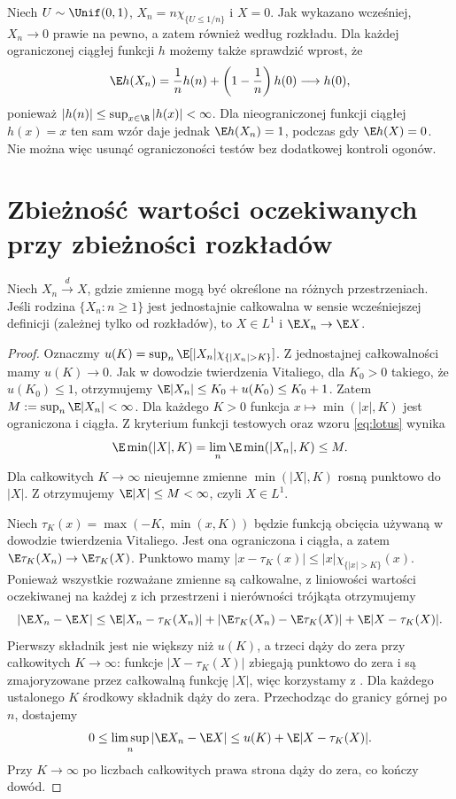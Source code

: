 \begin{przyklad}
Niech $U\sim\Unif(0,1)$, $X_n=n\chi_{\{U\leq1/n\}}$
i $X=0$. Jak wykazano wcześniej, $X_n\to0$ prawie
na pewno, a zatem również według rozkładu.
Dla każdej ograniczonej ciągłej funkcji $h$ możemy
także sprawdzić wprost, że
\[
\E h(X_n)=\frac1n h(n)+\left(1-\frac1n\right)h(0)
\longrightarrow h(0),
\]
ponieważ $|h(n)|\leq\sup_{x\in\R}|h(x)|<\infty$.
Dla nieograniczonej funkcji ciągłej $h(x)=x$
ten sam wzór daje jednak $\E h(X_n)=1$,
podczas gdy $\E h(X)=0$.
Nie można więc usunąć ograniczoności testów
bez dodatkowej kontroli ogonów.
\end{przyklad}

\section{Zbieżność wartości oczekiwanych przy zbieżności rozkładów}

\begin{twierdzenie}
Niech $X_n\xrightarrow{d}X$, gdzie zmienne mogą być
określone na różnych przestrzeniach. Jeśli rodzina
$\{X_n:n\geq1\}$ jest jednostajnie całkowalna
w sensie wcześniejszej definicji (zależnej tylko od rozkładów),
to $X\in L^1$ i $\E X_n\to\E X$.
\end{twierdzenie}
\begin{proof}
Oznaczmy $u(K)=\sup_n\E[|X_n|\chi_{\{|X_n|>K\}}]$.
Z jednostajnej całkowalności mamy $u(K)\to0$.
Jak w dowodzie twierdzenia Vitaliego, dla $K_0>0$
takiego, że $u(K_0)\leq1$, otrzymujemy
$\E|X_n|\leq K_0+u(K_0)\leq K_0+1$.
Zatem $M:=\sup_n\E|X_n|<\infty$.
Dla każdego $K>0$ funkcja $x\mapsto\min(|x|,K)$
jest ograniczona i ciągła. Z kryterium funkcji testowych
oraz wzoru \eqref{eq:lotus} wynika
\[
\E\min(|X|,K)=\lim_n\E\min(|X_n|,K)\leq M.
\]
Dla całkowitych $K\to\infty$ nieujemne zmienne
$\min(|X|,K)$ rosną punktowo do $|X|$.
Z 
otrzymujemy $\E|X|\leq M<\infty$, czyli $X\in L^1$.

Niech $\tau_K(x)=\max(-K,\min(x,K))$ będzie funkcją
obcięcia używaną w dowodzie twierdzenia Vitaliego.
Jest ona ograniczona i ciągła, a zatem
$\E\tau_K(X_n)\to\E\tau_K(X)$.
Punktowo mamy
$|x-\tau_K(x)|\leq|x|\chi_{\{|x|>K\}}(x)$.
Ponieważ wszystkie rozważane zmienne są całkowalne,
z liniowości wartości oczekiwanej na każdej z ich
przestrzeni i nierówności trójkąta otrzymujemy
\[
|\E X_n-\E X|\leq
\E|X_n-\tau_K(X_n)|
+|\E\tau_K(X_n)-\E\tau_K(X)|
+\E|X-\tau_K(X)|.
\]
Pierwszy składnik jest nie większy niż $u(K)$,
a trzeci dąży do zera przy całkowitych $K\to\infty$:
funkcje $|X-\tau_K(X)|$ zbiegają punktowo do zera
i są zmajoryzowane przez całkowalną funkcję $|X|$,
więc korzystamy z .
Dla każdego ustalonego $K$ środkowy składnik dąży do zera.
Przechodząc do granicy górnej po $n$, dostajemy
\[
0\leq\limsup_n|\E X_n-\E X|
\leq u(K)+\E|X-\tau_K(X)|.
\]
Przy $K\to\infty$ po liczbach całkowitych prawa
strona dąży do zera, co kończy dowód.
\end{proof}

